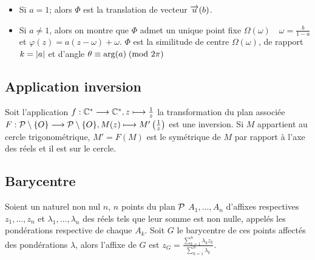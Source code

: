                                 \begin{itemize}
                                  \item Si \(a = 1\); alors  \(\Phi\) est la translation de vecteur 
                                    \(\vect{u}(b)\).
                                  \item Si \(a \neq 1\), alors on montre que \(\Phi\) admet un unique point 
                                    fixe \(\Omega(\omega) \quad \omega = \frac{b}{1-a}\) et \(\varphi(z) = 
                                    a(z-\omega) + \omega\).
                                    \(\Phi\) est la similitude de centre \(\Omega(\omega)\), de rapport \(k 
                                    = \abs{a}\) et d'angle \(\congru{\theta}{\arg(a)}{2\pi}\)
                                \end{itemize}

                                \subsection{Application inversion}
                                \label{subsec:appinverse}

                                Soit l'application \(\fonctionL{f}{\C^*}{\C^*}{z}{\frac{1}{z}}\) la 
                                transformation du plan associée \(\fonctionL{F}{\P \setminus\{O\}}{\P 
                                \setminus\{O\}}{M(z)}{M' \left( \frac{1}{z} \right)}\) est une inversion. Si 
                                \(M\) appartient au cercle trigonométrique, \(M' = F(M)\) est le symétrique de 
                                \(M\) par rapport à l'axe des réels et il est sur le cercle.

                                \subsection{Barycentre}
                                \label{subsec:complexebarycentre}

                                Soient un naturel non nul \(n\), \(n\) points du plan \(\P\) \(A_1, \ldots, 
                                A_n\) d'affixes respectives \(z_1, \ldots, z_n\) et \(\lambda_1, \ldots, 
                                \lambda_n\) des réels tels que leur somme est non nulle, appelés les 
                                pondérations respective de chaque \(A_k\). Soit \(G\) le barycentre de ces 
                                points affectés des pondérations \(\lambda\), alors l'affixe de \(G\) est \(z_G 
                                = \frac{\sum_{k = 1}^{n}\lambda_k z_k}{\sum_{k = 1}^{n}\lambda_k}\).

